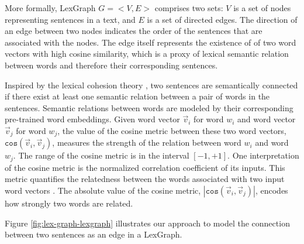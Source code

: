 More formally, LexGraph $G=<V,E>$ comprises two sets: $V$ is a set of nodes representing sentences in a text, and $E$ is a set of directed edges. 
The direction of an edge between two nodes indicates the order of the sentences that are associated with the nodes. 
The edge itself represents the existence of of two word vectors with high cosine similarity, which is a proxy of lexical semantic relation between words and therefore their corresponding sentences. 

Inspired by the lexical cohesion theory \cite{halliday76}, two sentences are semantically connected if there exist at least one semantic relation between a pair of words in the sentences. 
Semantic relations between words are modeled by their corresponding pre-trained word embeddings.  
Given word vector $\vec{v}_i$ for word $w_i$ and word vector $\vec{v}_j$ for word $w_j$, the value of the cosine metric between these two word vectors, $\mathtt{cos}(\vec{v}_i,\vec{v}_j)$, measures the strength of the relation between word $w_i$ and word $w_j$. 
The range of the cosine metric is in the interval $\left[ -1, +1 \right]$.  
One interpretation of the cosine metric is the normalized correlation coefficient of its inputs.
This metric quantifies the relatedness between the words associated with two input word vectors \cite{manning99}. 
The absolute value of the cosine metric, $|\mathtt{cos}(\vec{v}_i,\vec{v}_j)|$, encodes how strongly two words are related.  

Figure \ref{fig:lex-graph-lexgraph} illustrates our approach to model the connection between two sentences as an edge in a LexGraph. 

